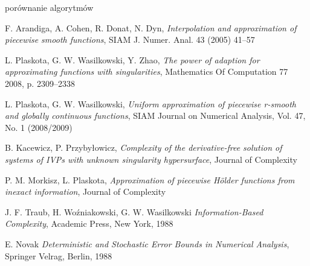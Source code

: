 \documentclass[oik, pdftex, robocza, man]{mgrwms}
\begin{document}
porównanie algorytmów


\mgrclosechapter



%  
\begin{thebibliography}{88}

    F. Arandiga, A. Cohen, R. Donat, N. Dyn,
    \emph{Interpolation and approximation of piecewise smooth functions}, SIAM J. Numer. Anal. 43 (2005) 41–57

    L. Plaskota, G. W. Wasilkowski, Y. Zhao, 
    \emph{The power of adaption for approximating functions with singularities}, Mathematics Of Computation 77
    2008, p. 2309–2338

    L. Plaskota, G. W. Wasilkowski, 
    \emph{Uniform approximation of piecewise r-smooth and globally continuous functions}, SIAM Journal on Numerical
    Analysis, Vol. 47, No. 1 (2008/2009)

    B. Kacewicz, P. Przybyłowicz, 
    \emph{Complexity of the derivative-free solution of
    systems of IVPs with unknown singularity hypersurface}, Journal of Complexity
    
    P. M. Morkisz, L. Plaskota, 
    \emph{Approximation of piecewise Hölder functions from inexact information}, Journal of Complexity

    J. F. Traub, H. Woźniakowski, G. W. Wasilkowski
    \emph{Information-Based Complexity}, Academic Press, New York, 1988

    E. Novak
    \emph{Deterministic and Stochastic Error Bounds in Numerical Analysis}, Springer Velrag, Berlin, 1988

\end{thebibliography}
\end{document}
